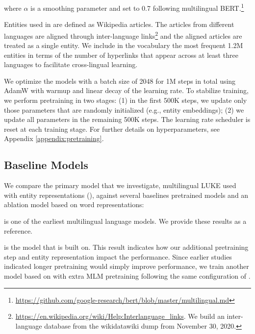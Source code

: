 \documentclass[11pt]{article}
\newcommand{\minisection}[1]{\noindent{\bf {#1}.}}
\newcommand{\minisectionNoDot}[1]{\noindent{\bf {#1}}}
\newcommand{\Appendix}[1]{Appendix \ref{#1}}
\begin{document}
\noindent
where $\alpha$ is a smoothing parameter and set to 0.7 following multilingual BERT.\footnote{\url{https://github.com/google-research/bert/blob/master/multilingual.md}}

\minisection{Entity Vocabulary}
Entities used in \mluke{} are defined as Wikipedia articles.
The articles from different languages are aligned through inter-language links\footnote{\url{https://en.wikipedia.org/wiki/Help:Interlanguage_links}. We build an inter-language database from the wikidatawiki dump from November 30, 2020.} and the aligned articles are treated as a single entity.
We include in the vocabulary the most frequent 1.2M entities in terms of the number of hyperlinks that appear across at least three languages to facilitate cross-lingual learning.


\minisection{Optimization}
We optimize the models with a batch size of 2048 for 1M steps in total using AdamW \citep{DBLP:conf/iclr/LoshchilovH19} with warmup and linear decay of the learning rate.
To stabilize training, we perform pretraining in two stages: (1) in the first 500K steps, we update only those parameters that are randomly initialized (e.g., entity embeddings); (2) we update all parameters in the remaining 500K steps.
The learning rate scheduler is reset at each training stage.
For further details on hyperparameters, see \Appendix{appendix:pretraining}.

\subsection{Baseline Models}

We compare the primary model that we investigate, multilingual LUKE used with entity representations ({\bf \mlukeE{}}), against several baselines pretrained models and an ablation model based on word representations:

\minisectionNoDot{\mbert{}} \citep{devlin2018bert} is one of the earliest multilingual language models. We provide these results as a reference.

\minisectionNoDot{\xlmr{}} \citep{conneau-etal-2020-unsupervised} is the model that \mluke{} is built on.
This result indicates how our additional pretraining step and entity representation impact the performance.
Since earlier studies \citep{Liu2019RoBERTaAR,lan2019albert} indicated longer pretraining would simply improve performance, we train another model based on \xlmr{}\ba{} with extra MLM pretraining following the same configuration of \mluke{}.
\end{document}
